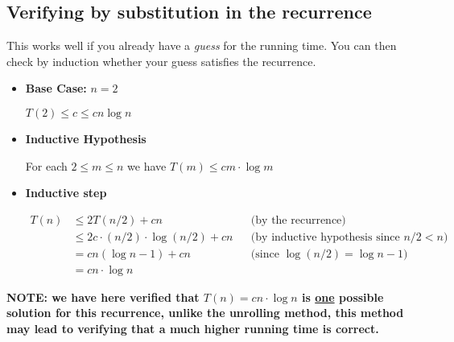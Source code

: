 \documentclass{article}
\begin{document}
\subsection{Verifying by substitution in the recurrence}

This works well if you already have a \textit{guess} for the running time. You can then check by induction whether your guess satisfies the recurrence.

\begin{itemize}
  \item \textbf{Base Case:} $n=2$

        $T(2) \leq c \leq cn \log n$

  \item \textbf{Inductive Hypothesis}

        For each $2\leq m \leq n$ we have $T(m) \leq cm \cdot \log m$


  \item \textbf{Inductive step}

        \begin{align*}
          T(n) &\leq 2T(n/2) + cn && \text{(by the recurrence)}\\
                &\leq 2c\cdot (n/2) \cdot \log(n/2) + cn && \text{(by inductive hypothesis since $n/2 < n$)}\\
                &= cn(\log n -1) + cn  && \text{(since $\log(n/2) = \log n -1$)}\\
                &= cn\cdot \log n &&
        \end{align*}
\end{itemize}

\textbf{NOTE: we have here verified that $T(n) = cn \cdot \log n$ is \underline{one} possible solution for this recurrence, unlike the unrolling method, this method may lead to verifying that a much higher running time is correct.}
\end{document}
